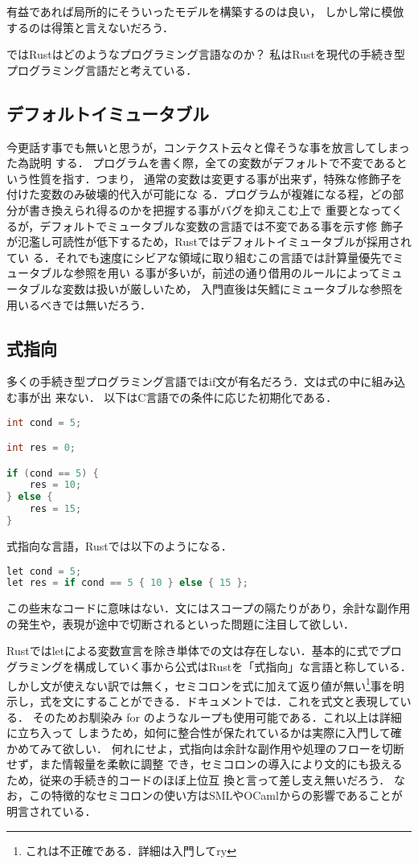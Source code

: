 有益であれば局所的にそういったモデルを構築するのは良い，
しかし常に模倣するのは得策と言えないだろう．

ではRustはどのようなプログラミング言語なのか？
私はRustを現代の手続き型プログラミング言語だと考えている．

\subsection{デフォルトイミュータブル}
今更話す事でも無いと思うが，コンテクスト云々と偉そうな事を放言してしまった為説明
する．
プログラムを書く際，全ての変数がデフォルトで不変であるという性質を指す．つまり，
通常の変数は変更する事が出来ず，特殊な修飾子を付けた変数のみ破壊的代入が可能にな
る．プログラムが複雑になる程，どの部分が書き換えられ得るのかを把握する事がバグを抑えこむ上で
重要となってくるが，デフォルトでミュータブルな変数の言語では不変である事を示す修
飾子が氾濫し可読性が低下するため，Rustではデフォルトイミュータブルが採用されてい
る．それでも速度にシビアな領域に取り組むこの言語では計算量優先でミュータブルな参照を用い
る事が多いが，前述の通り借用のルールによってミュータブルな変数は扱いが厳しいため，
入門直後は矢鱈にミュータブルな参照を用いるべきでは無いだろう．

\subsection{式指向}
多くの手続き型プログラミング言語ではif文が有名だろう．文は式の中に組み込む事が出
来ない．
以下はC言語での条件に応じた初期化である．

\begin{lstlisting}[language={C},caption=Cにおけるif文,label=c_if]
int cond = 5;

int res = 0;

if (cond == 5) {
    res = 10;
} else {
    res = 15;
}
\end{lstlisting}
式指向な言語，Rustでは以下のようになる．
\begin{lstlisting}[language={C++},caption=Rustにおけるif式,label=rust_if]
let cond = 5;
let res = if cond == 5 { 10 } else { 15 };
\end{lstlisting}
この些末なコードに意味はない．文にはスコープの隔たりがあり，余計な副作用の発生や，表現が途中で切断されるといった問題に注目して欲しい．

Rustではletによる変数宣言を除き単体での文は存在しない．基本的に式でプログラミングを構成していく事から公式はRustを「式指向」な言語と称している．
しかし文が使えない訳では無く，セミコロンを式に加えて返り値が無い\footnote{これは不正確である．詳細は入門してry}事を明示し，式を文にすることができる．ドキュメントでは．これを式文と表現している．
そのためお馴染み for のようなループも使用可能である．これ以上は詳細に立ち入って
しまうため，如何に整合性が保たれているかは実際に入門して確かめてみて欲しい．
何れにせよ，式指向は余計な副作用や処理のフローを切断せず，また情報量を柔軟に調整
でき，セミコロンの導入により文的にも扱えるため，従来の手続き的コードのほぼ上位互
換と言って差し支え無いだろう．
なお，この特徴的なセミコロンの使い方はSMLやOCamlからの影響であることが明言されている．\cite{inf}

